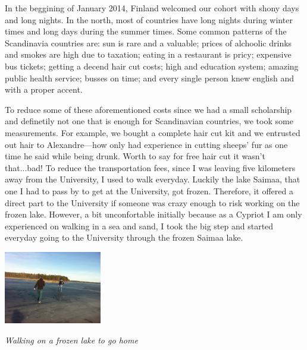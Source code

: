 \documentclass[10pt,a4paper]{article} %
\begin{document}
\begin{multicols}{3}
   
In the beggining of January 2014, Finland welcomed our cohort with shony days 
and long nights. 
In the north, most of countries have long nights during winter times and long 
days during the summer times. 
Some common patterns of the Scandinavia countries are: sun is rare and a valuable; 
prices of alchoolic drinks and smokes are high due to taxation; eating in a 
restaurant is pricy; expensive bus tickets; getting a decend hair cut costs; 
high and education system; amazing public health service; busses on time; 
and every single person knew english and with a proper accent.
     

To reduce some of these aforementioned costs since we had a small scholarship and 
definetily not one that is enough for Scandinavian countries, we took some 
measurements. 
For example, we bought a complete hair cut kit and we entrusted out hair to 
Alexandre---how only had experience in cutting sheeps' fur as one time he said 
while being drunk.  
Worth to say for free hair cut it wasn't that...bad! 
To reduce the transportation fees, since I was leaving five kilometers away from 
the University, I used to walk everyday. 
Luckily the lake Saimaa, that one I had to pass by to get at the University, got 
frozen. 
Therefore, it offered a direct part to the University if someone was crazy enough 
to risk working on the frozen lake. 
However, a bit unconfortable initially because as a Cypriot I am only experienced 
on walking in a sea and sand, I took the big step and started everyday 
going to the University through the frozen Saimaa lake.


\begin{center}
	\includegraphics[width=0.32\textwidth]{media/walking_on_ice.jpg}
	\par\textit{Walking on a frozen lake to go home}
\end{center}



\end{multicols}
\end{document}
